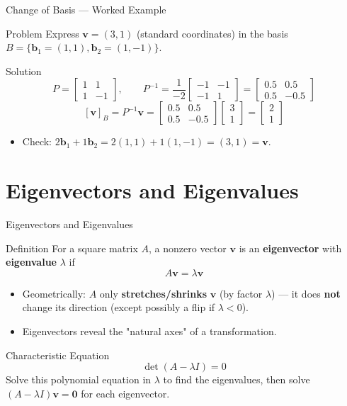 \documentclass[9pt,aspectratio=169]{beamer}
\newcommand{\vect}[1]{\mathbf{#1}}
\begin{document}
\begin{frame}{Change of Basis — Worked Example}
\begin{exampleblock}{Problem}
Express $\vect{v}=(3,1)$ (standard coordinates) in the basis $B=\{\vect{b}_1=(1,1), \vect{b}_2=(1,-1)\}$.
\end{exampleblock}
\begin{block}{Solution}
$$P = \begin{bmatrix}1&1\\1&-1\end{bmatrix}, \qquad P^{-1} = \frac{1}{-2}\begin{bmatrix}-1&-1\\-1&1\end{bmatrix} = \begin{bmatrix}0.5&0.5\\0.5&-0.5\end{bmatrix}$$
$$[\vect{v}]_B = P^{-1}\vect{v} = \begin{bmatrix}0.5&0.5\\0.5&-0.5\end{bmatrix}\begin{bmatrix}3\\1\end{bmatrix} = \begin{bmatrix}2\\1\end{bmatrix}$$
\end{block}
\begin{itemize}
\item Check: $2\vect{b}_1 + 1\vect{b}_2 = 2(1,1)+1(1,-1) = (3,1) = \vect{v}$. \checkmark
\end{itemize}
\end{frame}

\section{Eigenvectors and Eigenvalues}

\begin{frame}{Eigenvectors and Eigenvalues}
\begin{block}{Definition}
For a square matrix $A$, a nonzero vector $\vect{v}$ is an \textbf{eigenvector} with \textbf{eigenvalue} $\lambda$ if
$$A\vect{v} = \lambda \vect{v}$$
\end{block}
\begin{itemize}
\item Geometrically: $A$ only \textbf{stretches/shrinks} $\vect{v}$ (by factor $\lambda$) — it does \textbf{not} change its direction (except possibly a flip if $\lambda<0$).
\item Eigenvectors reveal the "natural axes" of a transformation.
\end{itemize}
\begin{block}{Characteristic Equation}
$$\det(A - \lambda I) = 0$$
Solve this polynomial equation in $\lambda$ to find the eigenvalues, then solve $(A-\lambda I)\vect{v}=\vect{0}$ for each eigenvector.
\end{block}
\end{frame}
\end{document}

